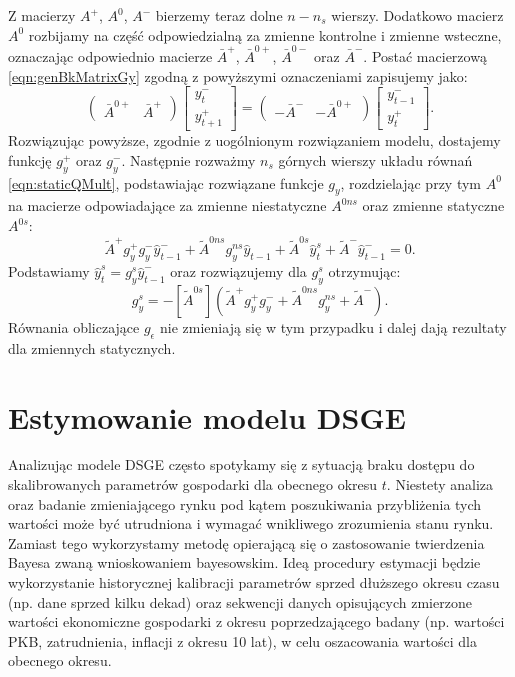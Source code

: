 Z macierzy $A^+$, $A^0$, $A^-$ bierzemy teraz dolne $n - n_s$ wierszy. Dodatkowo macierz $A^0$ rozbijamy na część odpowiedzialną za zmienne kontrolne i zmienne wsteczne, oznaczając odpowiednio macierze $\bar{A}^+$, $\bar{A}^{0+}$, $\bar{A}^{0-}$ oraz $\bar{A}^{-}$. Postać macierzową \eqref{eqn:genBkMatrixGy} zgodną z powyższymi oznaczeniami zapisujemy jako:
\begin{equation}
    \begin{pmatrix}
        \bar{A}^{0+} & \bar{A}^+
    \end{pmatrix}
    \begin{bmatrix}
        y_t^- \\
        y_{t+1}^+
    \end{bmatrix} = 
        \begin{pmatrix}
        -\bar{A}^{-} & -\bar{A}^{0+}
    \end{pmatrix}
    \begin{bmatrix}
        y_{t-1}^- \\
        y_{t}^+
    \end{bmatrix}.
\end{equation}
Rozwiązując powyższe, zgodnie z uogólnionym rozwiązaniem modelu, dostajemy funkcję $g_y^+$ oraz $g_y^-$. Następnie rozważmy $n_s$ górnych wierszy układu równań \eqref{eqn:staticQMult}, podstawiając rozwiązane funkcje $g_y$, rozdzielając przy tym $A^0$ na macierze odpowiadające za zmienne niestatyczne $A^{0ns}$ oraz zmienne statyczne $A^{0s}$:
\begin{equation}
    \widetilde{A}^+ g_y^+ g_y^- \hat{y}^-_{t-1} + \widetilde{A}^{0ns} g_y^{ns}\hat{y}_{t-1} + \widetilde{A}^{0s} \hat{y}_t^s + \widetilde{A}^- \hat{y}^-_{t-1} = 0.
\end{equation}
Podstawiamy $\hat{y}_t^s = g_y^s \hat{y}^-_{t-1}$ oraz rozwiązujemy dla $g_y^s$ otrzymując:
\begin{equation}
    g_y^s = - [\widetilde{A}^{0s}](\widetilde{A}^+ g_y^+ g_y^- + \widetilde{A}^{0ns} g_y^{ns} + \widetilde{A}^-).
\end{equation}
Równania obliczające $g_\epsilon$ nie zmieniają się w tym przypadku i dalej dają rezultaty dla zmiennych statycznych.

\section{Estymowanie modelu DSGE}
\label{sec:estimate_bayes_dsge}

Analizując modele DSGE często spotykamy się z sytuacją braku dostępu do skalibrowanych parametrów gospodarki dla obecnego okresu $t$. Niestety analiza oraz badanie zmieniającego rynku pod kątem poszukiwania przybliżenia tych wartości może być utrudniona i wymagać wnikliwego zrozumienia stanu rynku. Zamiast tego wykorzystamy metodę opierającą się o zastosowanie twierdzenia Bayesa zwaną wnioskowaniem bayesowskim. Ideą procedury estymacji będzie wykorzystanie historycznej kalibracji parametrów sprzed dłuższego okresu czasu (np. dane sprzed kilku dekad) oraz sekwencji danych opisujących zmierzone wartości ekonomiczne gospodarki z okresu poprzedzającego badany (np. wartości PKB, zatrudnienia, inflacji z okresu 10 lat), w celu oszacowania wartości dla obecnego okresu.

